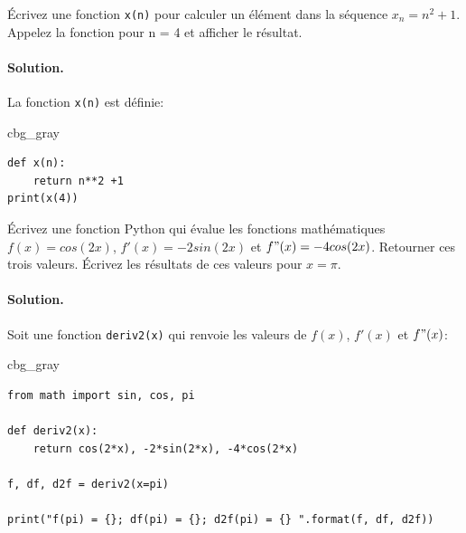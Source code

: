 \documentclass[%
oneside,                 %
final,                   %
10pt,french]{article}
\newenvironment{_cod_tight}[1]{
   \def\FrameCommand{\colorbox{#1}}
   \FrameRule0.6pt\MakeFramed {\FrameRestore}\vskip3mm}
   {\vskip0mm\endMakeFramed}
\newenvironment{cod}[1]{
\bgroup\rmfamily
\fboxsep=0mm\relax
\begin{_cod_tight}{#1}
\list{}{\parsep=-2mm\parskip=0mm\topsep=0pt\leftmargin=2mm
\rightmargin=2\leftmargin\leftmargin=4pt\relax}
\item\relax}
{\endlist\end{_cod_tight}\egroup}
\newenvironment{doconceexercise}{}{}
\newcounter{doconceexercisecounter}
\begin{document}


\begin{doconceexercise}



Écrivez une fonction \texttt{x(n)} pour calculer un élément dans la séquence $x_n = n^2 + 1 $. Appelez la fonction pour n = 4 et afficher le résultat.


\paragraph{Solution.}
La fonction \texttt{x(n)} est définie:
\begin{cod}{cbg_gray}\begin{verbatim}
def x(n):
    return n**2 +1
print(x(4))
\end{verbatim}
\end{cod}
\noindent


\end{doconceexercise}




\begin{doconceexercise}



Écrivez une fonction Python qui évalue les fonctions mathématiques $f(x) = cos(2x)$, $f'(x) = -2sin(2x)$ et $f"(x) = - 4 cos(2x)$. Retourner ces trois valeurs. Écrivez les résultats de ces valeurs pour $x = \pi$.


\paragraph{Solution.}
Soit une fonction \texttt{deriv2(x)} qui renvoie les valeurs de $f(x)$, $f'(x)$ et $f"(x)$:
\begin{cod}{cbg_gray}\begin{verbatim}
from math import sin, cos, pi

def deriv2(x):
    return cos(2*x), -2*sin(2*x), -4*cos(2*x)

f, df, d2f = deriv2(x=pi)

print("f(pi) = {}; df(pi) = {}; d2f(pi) = {} ".format(f, df, d2f))
\end{verbatim}
\end{cod}
\noindent


\end{doconceexercise}



\end{document}
